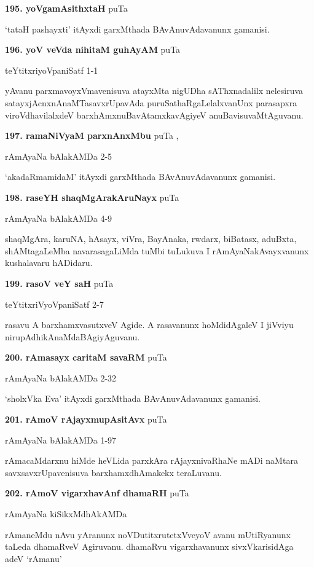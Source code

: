 \medskip
\noindent\textbf{195. yoVgamAsithxtaH} \hfill puTa \pageref{249b}

\hfill `tataH pashayxti' itAyxdi garxMthada BAvAnuvAdavanunx gamanisi.

\medskip
\noindent\textbf{196. yoV veVda nihitaM guhAyAM} \hfill puTa \pageref{108}

\hfill teYtitxriyoVpaniSatf 1-1

yAvanu parxmavoyxVmavenisuva atayxMta nigUDha sAThxnadalilx nelesiruva satayxjAcnxnAnaMTasavxrUpavAda puruSathaRgaLelalxvanUnx parasapxra viroVdhavilalxdeV barxhAmxnuBavAtamxkavAgiyeV anuBavisuvaMtAguvanu.

\medskip
\noindent\textbf{197. ramaNiVyaM parxnAnxMbu} \hfill puTa \pageref{165c},\pageref{211f}

\hfill rAmAyaNa bAlakAMDa 2-5

`akadaRmamidaM' itAyxdi garxMthada BAvAnuvAdavanunx gamanisi.

\medskip
\noindent\textbf{198. raseYH shaqMgArakAruNayx} \hfill puTa \pageref{188}

\hfill rAmAyaNa bAlakAMDa 4-9

shaqMgAra, karuNA, hAsayx, viVra, BayAnaka, rwdarx, biBatasx, aduBxta, shAMtagaLeMba navarasagaLiMda tuMbi tuLukuva I rAmAyaNakAvayxvanunx kushalavaru hADidaru.

\medskip
\noindent\textbf{199. rasoV veY saH} \hfill puTa \pageref{76c}

\hfill teYtitxriVyoVpaniSatf 2-7

rasavu A barxhamxvasutxveV Agide. A rasavanunx hoMdidAgaleV I jiVviyu nirupAdhikAnaMdaBAgiyAguvanu.

\medskip
\noindent\textbf{200. rAmasayx caritaM savaRM} \hfill puTa \pageref{204c}

\hfill rAmAyaNa bAlakAMDa 2-32

`sholxVka Eva' itAyxdi garxMthada BAvAnuvAdavanunx gamanisi.

\medskip
\noindent\textbf{201. rAmoV rAjayxmupAsitAvx} \hfill puTa \pageref{253a}

\hfill rAmAyaNa bAlakAMDa 1-97

rAmacaMdarxnu hiMde heVLida parxkAra rAjayxnivaRhaNe mADi naMtara savxsavxrUpavenisuva barxhamxdhAmakekx teraLuvanu.

\medskip
\noindent\textbf{202. rAmoV vigarxhavAnf dhamaRH} \hfill puTa \pageref{247}

\hfill rAmAyaNa kiSikxMdhAkAMDa

rAmaneMdu nAvu yAranunx noVDutitxrutetxVveyoV avanu mUtiRyanunx taLeda dhamaRveV Agiruvanu. dhamaRvu vigarxhavanunx sivxVkarisidAga adeV `rAmanu'

